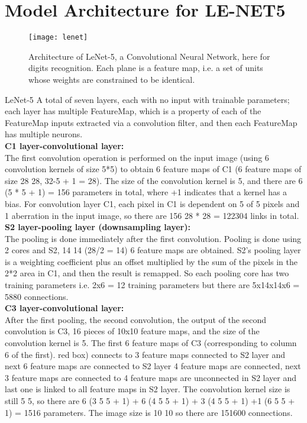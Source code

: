 \documentclass[thesis]{deutez}
\begin{document}
\section{Model Architecture for LE-NET5}
\begin{figure}[h!]
	\centering
	\texttt{[image: lenet]}
	\caption{Architecture of LeNet-5, a Convolutional Neural Network, here for digits recognition. Each plane is a feature map, i.e. a set of units
		whose weights are constrained to be identical.}
\end{figure}
\FloatBarrier
LeNet-5 A total of seven layers, each with no input with trainable parameters; each layer has multiple FeatureMap, which is a property of each of the FeatureMap inputs extracted via a convolution filter, and then each FeatureMap has multiple neurons.\\
\textbf{C1 layer-convolutional layer:}\\
The first convolution operation is performed on the input image (using 6 convolution kernels of size 5*5) to obtain 6 feature maps of C1 (6 feature maps of size 28 28, 32-5 + 1 = 28). The size of the convolution kernel is 5, and there are 6 (5 * 5 + 1) = 156 parameters in total, where +1 indicates that a kernel has a bias. For convolution layer C1, each pixel in C1 is dependent on 5 of 5 pixels and 1 aberration in the input image, so there are 156 28 * 28 = 122304 links in total.\cite{lenet}\\
\textbf{S2 layer-pooling layer (downsampling layer):}\\
The pooling is done immediately after the first convolution. Pooling is done using 2 cores and S2, 14 14 (28/2 = 14) 6 feature maps are obtained. S2's pooling layer is a weighting coefficient plus an offset multiplied by the sum of the pixels in the 2*2 area in C1, and then the result is remapped. So each pooling core has two training parameters i.e. 2x6 = 12 training parameters but there are 5x14x14x6 = 5880 connections.\cite{lenet}\\
\textbf{C3 layer-convolutional layer:}\\
After the first pooling, the second convolution, the output of the second convolution is C3, 16 pieces of 10x10 feature maps, and the size of the convolution kernel is 5. The first 6 feature maps of C3 (corresponding to column 6 of the first). red box) connects to 3 feature maps connected to S2 layer and next 6 feature maps are connected to S2 layer 4 feature maps are connected, next 3 feature maps are connected to 4 feature maps are unconnected in S2 layer and last one is linked to all feature maps in S2 layer. The convolution kernel size is still 5 5, so there are 6 (3 5 5 + 1) + 6 (4 5 5 + 1) + 3 (4 5 5 + 1) +1 (6 5 5 + 1) = 1516 parameters. The image size is 10 10 so there are 151600 connections.\cite{lenet}\\
\end{document}
